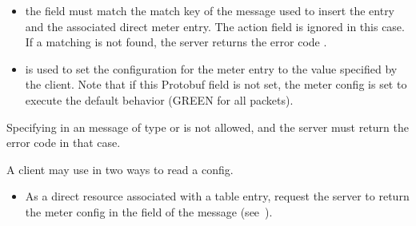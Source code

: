 \documentclass[11pt]{article}
\begin{document}
{%
\begin{itemize}%

\item{}
the  field must match the match key of the 
message used to insert the entry and the associated direct meter entry. The
action field is ignored in this case. If a matching  is not found,
the server returns the error code .%

\item{}
 is used to set the configuration for the meter entry to the value
specified by the client. Note that if this Protobuf field is not set, the
meter config is set to execute the default behavior (GREEN for all packets).%
\end{itemize}%

\noindent{}Specifying  in an  message of type  or
 is not allowed, and the server must return the error code
 in that case.%

A client may use  in two ways to read a  config.%

\begin{itemize}%

\item{}
As a direct resource associated with a table entry, request the server to
return the meter config in the  field of the 
message (see~).%


\end{itemize}}
\end{document}
